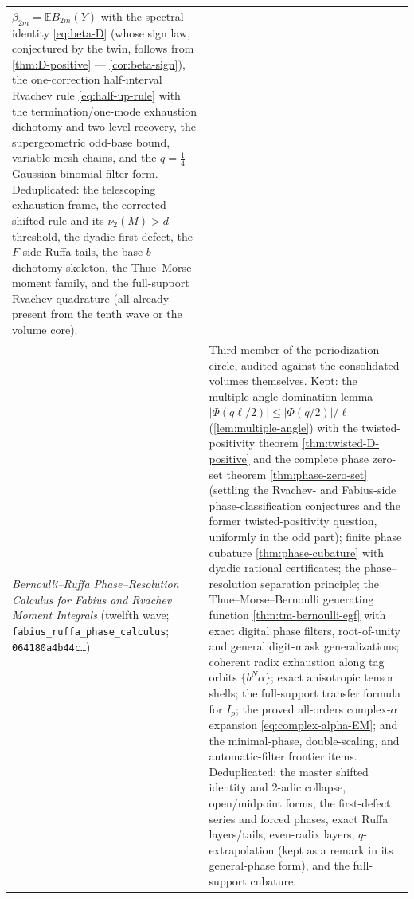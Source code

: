 \documentclass[11pt,oneside]{article}
\numberwithin{equation}{section}
\theoremstyle{definition}
\theoremstyle{remark}
\newcommand{\E}{\mathbb E}
\newcommand{\vtwo}{\nu_2}
\newcommand{\abs}[1]{\left\lvert #1\right\rvert}
\begin{document}
\begin{center}
\begin{tabular}{@{}p{}p{}@{}}
$\beta_{2m}=\E B_{2m}(Y)$ with the spectral identity
\eqref{eq:beta-D} (whose sign law, conjectured by the twin, follows
from \cref{thm:D-positive} --- \cref{cor:beta-sign}), the
one-correction half-interval Rvachev rule \eqref{eq:half-up-rule}
with the termination/one-mode exhaustion dichotomy and two-level
recovery, the supergeometric odd-base bound, variable mesh chains,
and the $q=\tfrac14$ Gaussian-binomial filter form.  Deduplicated:
the telescoping exhaustion frame, the corrected shifted rule and its
$\vtwo(M)>d$ threshold, the dyadic first defect, the $F$-side Ruffa
tails, the base-$b$ dichotomy skeleton, the Thue--Morse moment
family, and the full-support Rvachev quadrature (all already present
from the tenth wave or the volume core). \\
\addlinespace
\emph{Bernoulli--Ruffa Phase--Resolution Calculus for Fabius and
Rvachev Moment Integrals} (twelfth wave;
\nolinkurl{fabius_ruffa_phase_calculus};
\texttt{064180a4b44c\ldots})
& Third member of the periodization circle, audited against the
consolidated volumes themselves.  Kept: the multiple-angle domination
lemma $\abs{\Phi(q\ell/2)}\le\abs{\Phi(q/2)}/\ell$
(\cref{lem:multiple-angle}) with the twisted-positivity theorem
\cref{thm:twisted-D-positive} and the complete phase zero-set theorem
\cref{thm:phase-zero-set} (settling the Rvachev- and Fabius-side
phase-classification conjectures and the former twisted-positivity
question, uniformly in the odd part); finite phase cubature
\cref{thm:phase-cubature} with dyadic rational certificates; the
phase--resolution separation principle; the Thue--Morse--Bernoulli
generating function \cref{thm:tm-bernoulli-egf} with exact digital
phase filters, root-of-unity and general digit-mask generalizations;
coherent radix exhaustion along tag orbits $\{b^N\alpha\}$; exact
anisotropic tensor shells; the full-support transfer formula for
$I_p$; the proved all-orders complex-$\alpha$ expansion
\eqref{eq:complex-alpha-EM}; and the minimal-phase, double-scaling,
and automatic-filter frontier items.  Deduplicated: the master
shifted identity and $2$-adic collapse, open/midpoint forms, the
first-defect series and forced phases, exact Ruffa layers/tails,
even-radix layers, $q$-extrapolation (kept as a remark in its
general-phase form), and the full-support cubature. \\
\bottomrule
\end{tabular}
\end{center}
\end{document}
